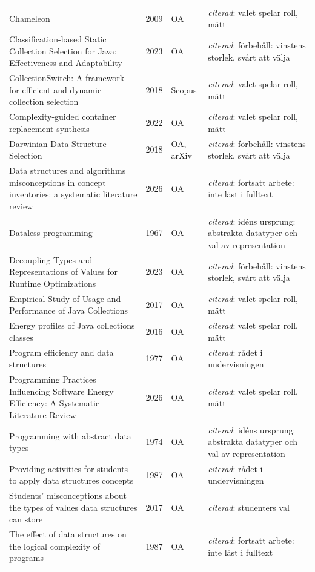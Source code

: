 \begin{longtable}{@{}%
  >{\raggedright\arraybackslash}p{}c%
  >{\raggedright\arraybackslash}p{}%
  >{\raggedright\arraybackslash}p{}@{}}
Chameleon & 2009 & OA & \emph{citerad}: valet spelar roll, mätt \\
Classification-based Static Collection Selection for Java: Effectiveness and Adaptability & 2023 & OA & \emph{citerad}: förbehåll: vinstens storlek, svårt att välja \\
CollectionSwitch: A framework for efficient and dynamic collection selection & 2018 & Scopus & \emph{citerad}: valet spelar roll, mätt \\
Complexity-guided container replacement synthesis & 2022 & OA & \emph{citerad}: valet spelar roll, mätt \\
Darwinian Data Structure Selection & 2018 & OA, arXiv & \emph{citerad}: förbehåll: vinstens storlek, svårt att välja \\
Data structures and algorithms misconceptions in concept inventories: a systematic literature review & 2026 & OA & \emph{citerad}: fortsatt arbete: inte läst i fulltext \\
Dataless programming & 1967 & OA & \emph{citerad}: idéns ursprung: abstrakta datatyper och val av representation \\
Decoupling Types and Representations of Values for Runtime Optimizations & 2023 & OA & \emph{citerad}: förbehåll: vinstens storlek, svårt att välja \\
Empirical Study of Usage and Performance of Java Collections & 2017 & OA & \emph{citerad}: valet spelar roll, mätt \\
Energy profiles of Java collections classes & 2016 & OA & \emph{citerad}: valet spelar roll, mätt \\
Program efficiency and data structures & 1977 & OA & \emph{citerad}: rådet i undervisningen \\
Programming Practices Influencing Software Energy Efficiency: A Systematic Literature Review & 2026 & OA & \emph{citerad}: valet spelar roll, mätt \\
Programming with abstract data types & 1974 & OA & \emph{citerad}: idéns ursprung: abstrakta datatyper och val av representation \\
Providing activities for students to apply data structures concepts & 1987 & OA & \emph{citerad}: rådet i undervisningen \\
Students' misconceptions about the types of values data structures can store & 2017 & OA & \emph{citerad}: studenters val \\
The effect of data structures on the logical complexity of programs & 1987 & OA & \emph{citerad}: fortsatt arbete: inte läst i fulltext \\
\end{longtable}
\endgroup
